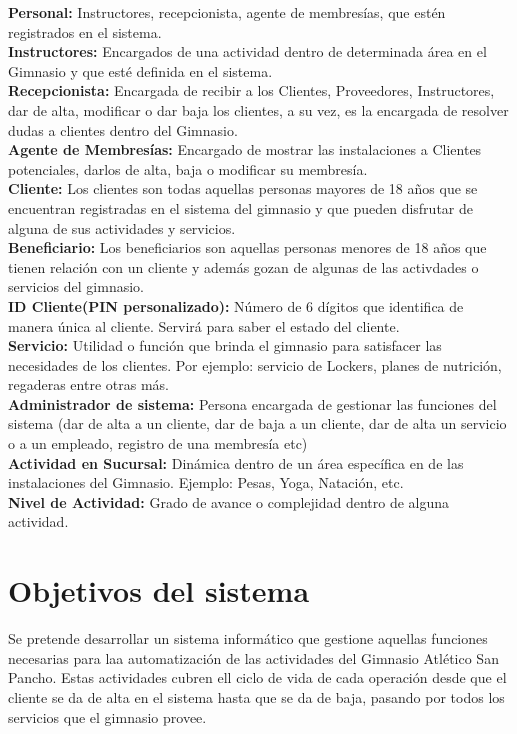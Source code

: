 \textbf{Personal:} Instructores, recepcionista, agente de membres\'ias, que est\'en registrados en el sistema.\\

\textbf{Instructores:} Encargados de una actividad dentro de determinada \'area en el Gimnasio y que est\'e definida en el sistema.\\

\textbf{Recepcionista: }Encargada de recibir a los Clientes, Proveedores, Instructores, dar de alta, modificar o dar baja los clientes, a su vez, es la encargada de resolver dudas a clientes dentro del Gimnasio.\\

\textbf{Agente de Membresías:} Encargado de mostrar las instalaciones a Clientes potenciales, darlos de alta, baja o modificar su membres\'ia.\\

\textbf{Cliente:} Los clientes son todas aquellas personas mayores de 18 años que se encuentran registradas en el sistema del gimnasio y que pueden disfrutar de alguna de sus actividades y servicios.\\

\textbf{Beneficiario:} Los beneficiarios son aquellas personas menores de 18 años que tienen relación con un cliente y además gozan de algunas de las activdades o servicios del gimnasio.\\

\textbf{ID Cliente(PIN personalizado):} Número  de 6 d\'igitos que identifica de manera \'unica al cliente. Servir\'a para saber el estado del cliente.\\

\textbf{Servicio: }Utilidad o funci\'on que brinda el gimnasio para satisfacer las necesidades de los clientes. Por ejemplo: servicio de Lockers, planes de nutrici\'on, regaderas entre otras m\'as.\\

\textbf{Administrador de sistema: }Persona encargada de gestionar las funciones del sistema (dar de alta a un cliente, dar de baja a un cliente, dar de alta un servicio o a un empleado, registro de una membres\'ia etc)\\

\textbf{Actividad en Sucursal: }Din\'amica dentro de un \'area espec\'ifica en de las instalaciones del Gimnasio. Ejemplo: Pesas, Yoga, Natación, etc.\\

\textbf{Nivel de Actividad:} Grado de avance o complejidad dentro de alguna actividad.

\section{Objetivos del sistema}
Se pretende desarrollar un sistema inform\'atico que gestione aquellas funciones necesarias para laa automatizaci\'on de las actividades del Gimnasio Atl\'etico San Pancho. Estas actividades cubren ell ciclo de vida de cada operaci\'on desde que el cliente se da de alta en el sistema hasta que se da de baja, pasando por todos los servicios que el gimnasio provee.
\clearedoublepage

